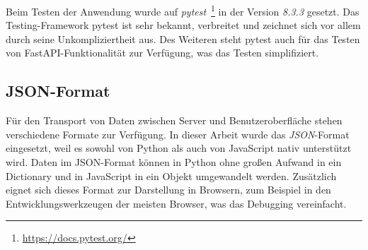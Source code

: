 Beim Testen der Anwendung wurde auf \textit{pytest}~\footnote{\hspace{1.5mm}\url{https://docs.pytest.org/}} in der Version \textit{8.3.3} gesetzt.
Das Testing-Framework pytest ist sehr bekannt, verbreitet und zeichnet sich vor allem durch seine Unkompliziertheit aus.
Des Weiteren steht pytest auch für das Testen von FastAPI-Funktionalität zur Verfügung, was das Testen simplifiziert. 

\subsection{JSON-Format}

Für den Transport von Daten zwischen Server und Benutzeroberfläche stehen verschiedene Formate zur Verfügung. In dieser Arbeit wurde das \textit{JSON}-Format eingesetzt,
weil es sowohl von Python als auch von JavaScript nativ unterstützt wird. Daten im JSON-Format können in Python ohne großen Aufwand in ein Dictionary und in JavaScript in ein Objekt umgewandelt werden.
Zusätzlich eignet sich dieses Format zur Darstellung in Browsern, zum Beispiel in den Entwicklungswerkzeugen der meisten Browser, was das Debugging vereinfacht.
